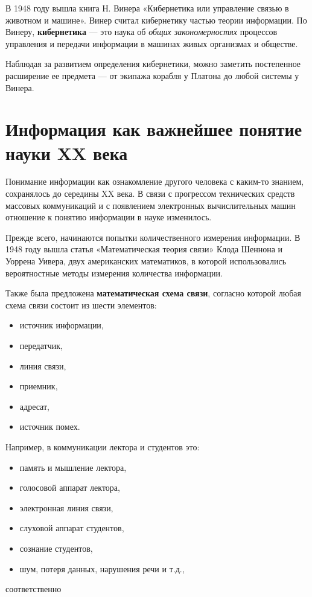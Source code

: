 В 1948 году вышла книга Н. Винера «Кибернетика или управление связью в животном и машине». Винер считал кибернетику частью теории информации. По Винеру, \textbf{кибернетика} --- это наука об \textit{общих закономерностях} процессов управления и передачи информации в машинах живых организмах и обществе.  

Наблюдая за развитием определения кибернетики, можно заметить постепенное расширение ее предмета --- от экипажа корабля у Платона до любой системы у Винера.


\section{Информация как важнейшее понятие науки XX
века}

Понимание информации как ознакомление другого человека с каким-то знанием, сохранялось до середины XX века. В связи с прогрессом технических средств массовых коммуникаций и с появлением электронных вычислительных машин отношение к понятию информации в науке изменилось. 

Прежде всего, начинаются попытки количественного измерения информации. В 1948 году вышла статья «Математическая теория связи» Клода Шеннона и Уоррена Уивера, двух американских математиков, в которой использовались вероятностные методы измерения количества информации. 

Также была предложена \textbf{математическая схема связи}, согласно которой любая схема связи состоит из шести элементов:
\begin{itemize}
    \item источник информации,
    \item передатчик,
    \item линия связи,
    \item приемник,
    \item адресат,
    \item источник помех.
\end{itemize}
Например, в коммуникации лектора и студентов это:
\begin{itemize}
    \item память и мышление лектора,
    \item голосовой аппарат лектора,
    \item электронная линия связи,
    \item слуховой аппарат студентов,
    \item сознание студентов,
    \item шум, потеря данных, нарушения речи и т.д.,
\end{itemize}
соответственно
 
